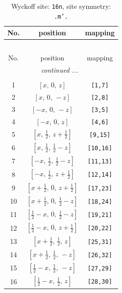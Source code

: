 \documentclass[fleqn,8pt]{jsarticle}
\begin{document}
\renewcommand{\arraystretch}{1.2}
\begin{longtable}{ccc}
\caption{Wyckoff site: {\tt 16n}, site symmetry: {\tt .m'.}}
 \\
 \hline \hline
No. & position & mapping \\ \hline \endfirsthead

\multicolumn{2}{l}{\tablename\ \thetable{}} \\
 \hline \hline
No. & position & mapping \\ \hline \endhead

 \hline \hline
\multicolumn{2}{r}{\footnotesize\it continued ...} \\ \endfoot

 \hline \hline
\multicolumn{2}{r}{} \\ \endlastfoot

1 & $\left[ x,\, 0,\, z \right]$ & {\tt [1,7]} \\ \hline
2 & $\left[ x,\, 0,\, - z \right]$ & {\tt [2,8]} \\ \hline
3 & $\left[ - x,\, 0,\, - z \right]$ & {\tt [3,5]} \\ \hline
4 & $\left[ - x,\, 0,\, z \right]$ & {\tt [4,6]} \\ \hline
5 & $\left[ x,\, \frac{1}{2},\, z + \frac{1}{2} \right]$ & {\tt [9,15]} \\ \hline
6 & $\left[ x,\, \frac{1}{2},\, \frac{1}{2} - z \right]$ & {\tt [10,16]} \\ \hline
7 & $\left[ - x,\, \frac{1}{2},\, \frac{1}{2} - z \right]$ & {\tt [11,13]} \\ \hline
8 & $\left[ - x,\, \frac{1}{2},\, z + \frac{1}{2} \right]$ & {\tt [12,14]} \\ \hline
9 & $\left[ x + \frac{1}{2},\, 0,\, z + \frac{1}{2} \right]$ & {\tt [17,23]} \\ \hline
10 & $\left[ x + \frac{1}{2},\, 0,\, \frac{1}{2} - z \right]$ & {\tt [18,24]} \\ \hline
11 & $\left[ \frac{1}{2} - x,\, 0,\, \frac{1}{2} - z \right]$ & {\tt [19,21]} \\ \hline
12 & $\left[ \frac{1}{2} - x,\, 0,\, z + \frac{1}{2} \right]$ & {\tt [20,22]} \\ \hline
13 & $\left[ x + \frac{1}{2},\, \frac{1}{2},\, z \right]$ & {\tt [25,31]} \\ \hline
14 & $\left[ x + \frac{1}{2},\, \frac{1}{2},\, - z \right]$ & {\tt [26,32]} \\ \hline
15 & $\left[ \frac{1}{2} - x,\, \frac{1}{2},\, - z \right]$ & {\tt [27,29]} \\ \hline
16 & $\left[ \frac{1}{2} - x,\, \frac{1}{2},\, z \right]$ & {\tt [28,30]} \\
\end{longtable}
\end{document}
